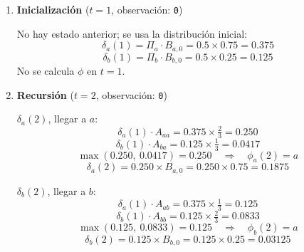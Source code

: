 \begin{enumerate}
  
\item \textbf{Inicialización} ($t=1$, observación: \texttt{0})
  
  No hay estado anterior; se usa la distribución inicial:
  \[
  \delta_a(1) = \Pi_a \cdot B_{a,0} = 0.5 \times 0.75 = \mathbf{0.375}
  \]
  \[
  \delta_b(1) = \Pi_b \cdot B_{b,0} = 0.5 \times 0.25 = \mathbf{0.125}
  \]
  No se calcula $\phi$ en $t=1$.
  
  \begin{center}
  \end{center}
  
\item \textbf{Recursión} ($t=2$, observación: \texttt{0})
  
  $\delta_a(2)$, llegar a $a$:
  \[
  \delta_a(1)\cdot A_{aa} = 0.375 \times \tfrac{2}{3} = 0.250
  \]
  \[
  \delta_b(1)\cdot A_{ba} = 0.125 \times \tfrac{1}{3} = 0.0417
  \]
  \[
  \max(0.250,\ 0.0417) = 0.250 \quad\Rightarrow\quad \phi_a(2) = a
  \]
  \[
  \delta_a(2) = 0.250 \times B_{a,0} = 0.250 \times 0.75 = \mathbf{0.1875}
  \]
  
  $\delta_b(2)$, llegar a $b$:
  \[
  \delta_a(1)\cdot A_{ab} = 0.375 \times \tfrac{1}{3} = 0.125
  \]
  \[
  \delta_b(1)\cdot A_{bb} = 0.125 \times \tfrac{2}{3} = 0.0833
  \]
  \[
  \max(0.125,\ 0.0833) = 0.125 \quad\Rightarrow\quad \phi_b(2) = a
  \]
  \[
  \delta_b(2) = 0.125 \times B_{b,0} = 0.125 \times 0.25 = \mathbf{0.03125}
  \]
  
  \begin{center}
\end{center}
\end{enumerate}
